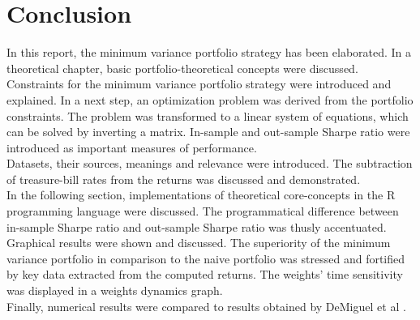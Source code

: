 \newpage

\section{Conclusion}
In this report, the minimum variance portfolio strategy has been elaborated. In a theoretical chapter, basic portfolio-theoretical concepts were discussed. Constraints for the minimum variance portfolio strategy were introduced and explained. In a next step, an optimization problem was derived from the portfolio constraints. The problem was transformed to a linear system of equations, which can be solved by inverting a matrix. In-sample and out-sample Sharpe ratio were introduced as important measures of performance. \\

Datasets, their sources, meanings and relevance were introduced. The subtraction of treasure-bill rates from the returns was discussed and demonstrated. \\

In the following section, implementations of theoretical core-concepts in the R programming language were discussed. The programmatical difference between in-sample Sharpe ratio and out-sample Sharpe ratio was thusly accentuated.\\

Graphical results were shown and discussed. The superiority of the minimum variance portfolio in comparison to the naive portfolio was stressed and fortified by key data extracted from the computed returns. The weights' time sensitivity was displayed in a weights dynamics graph.\\

Finally, numerical results were compared to results obtained by DeMiguel et al \cite{DEM09}.

